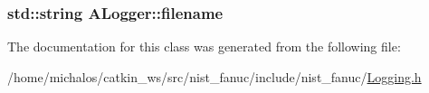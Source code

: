 \hypertarget{classALogger_a963caefa4b53d7fc416744c0150257af}{
\subsubsection[{filename}]{\setlength{\rightskip}{0pt plus 5cm}std\-::string A\-Logger\-::filename}}\label{classALogger_a963caefa4b53d7fc416744c0150257af}


The documentation for this class was generated from the following file\-:\begin{DoxyCompactItemize}
\item 
/home/michalos/catkin\-\_\-ws/src/nist\-\_\-fanuc/include/nist\-\_\-fanuc/\hyperlink{Logging_8h}{Logging.\-h}\end{DoxyCompactItemize}
